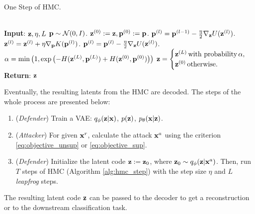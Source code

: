 \begin{algorithm}
	\caption{One Step of HMC.}
	\label{alg:hmc_step}
	\begin{algorithmic} %
 \\\hrulefill
	   \State \hskip-3mm \textbf{Input}: ${\mathbf{z}}, \eta, L$
		\State ${\mathbf{p}} \sim \mathcal{N}(0,I)$. 
		\State ${\mathbf{z}}^{(0)} := {\mathbf{z}}, {\mathbf{p}}^{(0)}:={\mathbf{p}}$.
		 
        \State $ {\mathbf{p}}^{(l)} = {\mathbf{p}}^{(l-1)} - \frac{\eta}{2}\nabla_{{\mathbf{z}}} U(\mathbf{z}^{(l)})$.
		\State ${\mathbf{z}}^{(l)} = {\mathbf{z}}^{(l)} + \eta  \nabla_{{\mathbf{p}}} K({\mathbf{p}}^{(l)})$.
		\State ${\mathbf{p}}^{(l)} = {\mathbf{p}}^{(l)} - \frac{\eta}{2}\nabla_{{\mathbf{z}}} U(\mathbf{z}^{(l)})$.
		\EndFor
		\State $\alpha = \min\left(1, \exp\left(- H({\mathbf{z}}^{(L)}, {\mathbf{p}}^{(L)}) + H({\mathbf{z}}^{(0)}, {\mathbf{p}}^{(0)})\right) \right)$
		\State ${\mathbf{z}} =
\begin{cases}
{\mathbf{z}}^{(L)}\, \text{with probability}\, \alpha ,\\
{\mathbf{z}}^{(0)}\, \text{otherwise}.
\end{cases}$  
        \State  \hskip-3mm \textbf{Return}: ${\mathbf{z}}$
	\end{algorithmic}
\end{algorithm}

Eventually, the resulting latents from the HMC are decoded. The steps of the whole process are presented below:
\begin{enumerate}%
    \item (\textit{Defender}) Train a VAE: $q_{\phi}({\mathbf{z}}|{\mathbf{x}})$, $p({\mathbf{z}})$, $p_{\theta}({\mathbf{x}}|{\mathbf{z}})$.
    \item (\textit{Attacker}) For given ${\mathbf{x}}^r$, calculate the attack ${\mathbf{x}}^{a}$ using the criterion \eqref{eq:objective_unsup} or \eqref{eq:objective_sup}.
    \item (\textit{Defender}) Initialize the latent code ${\mathbf{z}} := {\mathbf{z}}_0$, where ${\mathbf{z}}_{0} \sim q_{\phi}({\mathbf{z}}|{\mathbf{x}}^{a})$. Then, run $T$ steps of HMC (Algorithm \ref{alg:hmc_step}) with the step size $\eta$ and $L$ \textit{leapfrog} steps.
\end{enumerate}

The resulting latent code ${\mathbf{z}}$ can be passed to the decoder to get a reconstruction or to the downstream classification task.

